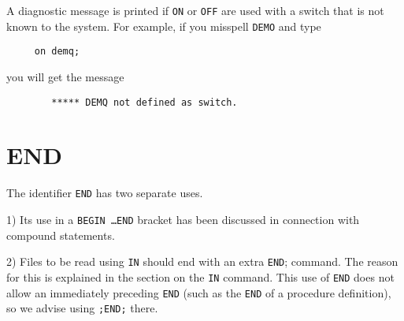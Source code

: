 A diagnostic message is printed if {\tt ON} or {\tt OFF}
 are used with a switch that is not known to the system.  For
example, if you misspell {\tt DEMO} and type
\begin{verbatim}
     on demq;
\end{verbatim}
you will get the message
\begin{verbatim}
        ***** DEMQ not defined as switch.
\end{verbatim}

\section{END}

The identifier {\tt END} has two separate uses.

1) Its use in a {\tt BEGIN \ldots END} bracket has been discussed in
connection with compound statements.

2) Files to be read using {\tt IN} should end with an extra {\tt END};
command.  The reason for this is explained in the section on the {\tt IN}
command.  This use of {\tt END} does not allow an immediately
preceding {\tt END} (such as the {\tt END} of a procedure definition), so
we advise using {\tt ;END;} there.



